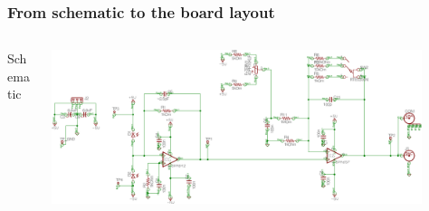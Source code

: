 \documentclass[beamer]{standalone}
\begin{document}
\begin{frame}
\frametitle{From schematic to the board layout}
 \begin{columns}[c]
  \begin{column}{.18\textwidth}
   Schematic
  \end{column}
  \begin{column}{.82\textwidth}
    \includegraphics[width=0.9\textwidth]{./pics/bpd_v3_schematics.pdf}
  \end{column}
 \end{columns}


\end{frame}
\end{document}
